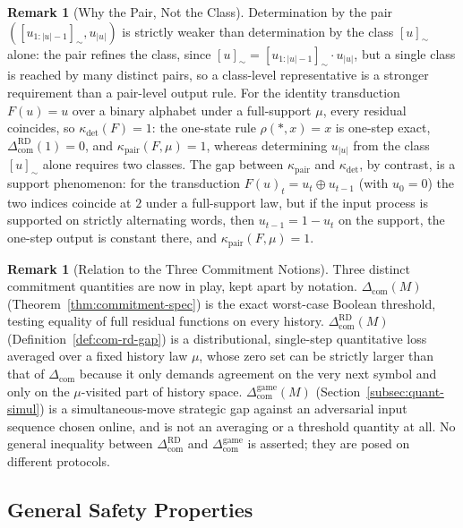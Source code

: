\documentclass[12pt]{article}
\theoremstyle{definition}
\newtheorem{remark}[theorem]{Remark}
\newcommand{\Com}{\Delta_{\mathrm{com}}}
\newcommand{\Comex}{\Com}
\newcommand{\ComRD}{\Delta_{\mathrm{com}}^{\mathrm{RD}}}
\newcommand{\ComGame}{\Delta_{\mathrm{com}}^{\mathrm{game}}}
\begin{document}
\begin{remark}[Why the Pair, Not the Class]
\label{rem:pair-vs-class}
Determination by the pair $([u_{1:|u|-1}]_\sim,u_{|u|})$ is strictly weaker
than determination by the class $[u]_\sim$ alone: the pair refines the
class, since $[u]_\sim=[u_{1:|u|-1}]_\sim\cdot u_{|u|}$, but a single class
is reached by many distinct pairs, so a class-level representative is a
stronger requirement than a pair-level output rule.  For the identity
transduction $F(u)=u$ over a binary alphabet under a full-support $\mu$,
every residual coincides, so $\kappa_{\det}(F)=1$: the one-state rule
$\rho(*,x)=x$ is one-step exact, $\ComRD(1)=0$, and
$\kappa_{\mathrm{pair}}(F,\mu)=1$, whereas determining $u_{|u|}$ from the
class $[u]_\sim$ alone requires two classes.  The gap between
$\kappa_{\mathrm{pair}}$ and $\kappa_{\det}$, by contrast, is a support
phenomenon: for the transduction $F(u)_t=u_t\oplus u_{t-1}$ (with $u_0=0$)
the two indices coincide at $2$ under a full-support law, but if the input
process is supported on strictly alternating words, then $u_{t-1}=1-u_t$ on
the support, the one-step output is constant there, and
$\kappa_{\mathrm{pair}}(F,\mu)=1$.
\end{remark}

\begin{remark}[Relation to the Three Commitment Notions]
\label{rem:com-rd-scope}
Three distinct commitment quantities are now in play, kept apart by
notation. $\Comex(M)$ (Theorem~\ref{thm:commitment-spec}) is the exact
worst-case Boolean threshold, testing equality of full residual functions on
every history.  $\ComRD(M)$ (Definition~\ref{def:com-rd-gap}) is a
distributional, single-step quantitative loss averaged over a fixed history
law $\mu$, whose zero set can be strictly larger than that of $\Comex$
because it only demands agreement on the very next symbol and only on the
$\mu$-visited part of history space.  $\ComGame(M)$
(Section~\ref{subsec:quant-simul}) is a simultaneous-move strategic gap
against an adversarial input sequence chosen online, and is not an averaging
or a threshold quantity at all.  No general inequality between $\ComRD$ and
$\ComGame$ is asserted; they are posed on different protocols.
\end{remark}

\subsection{General Safety Properties}
\label{subsec:safety}
\end{document}
